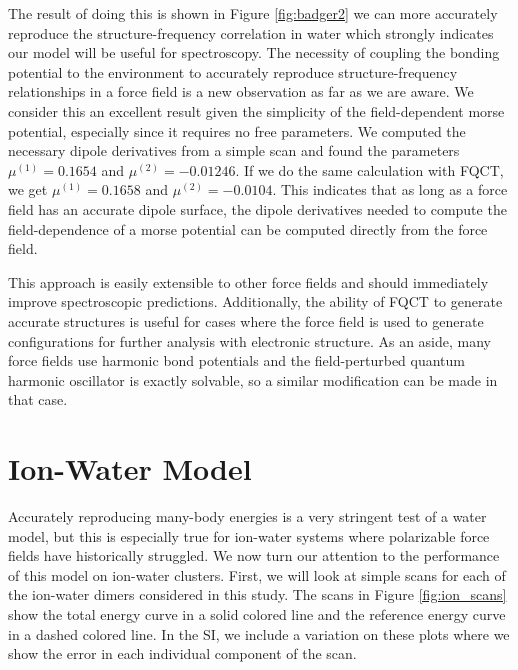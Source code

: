 \documentclass[journal=jctcce,manuscript=article]{achemso}
\begin{document}
The result of doing this is shown in Figure \ref{fig:badger2} we can more accurately reproduce the structure-frequency correlation in water which strongly indicates our model will be useful for spectroscopy. The necessity of coupling the bonding potential to the environment to accurately reproduce structure-frequency relationships in a force field is a new observation as far as we are aware. We consider this an excellent result given the simplicity of the field-dependent morse potential, especially since it requires no free parameters. We computed the necessary dipole derivatives from a simple  scan and found the parameters $\mu^{(1)}=0.1654$ and $\mu^{(2)}=-0.01246$. If we do the same calculation with FQCT, we get $\mu^{(1)}=0.1658$ and $\mu^{(2)}=-0.0104$. This indicates that as long as a force field has an accurate dipole surface, the dipole derivatives needed to compute the field-dependence of a morse potential can be computed directly from the force field.

This approach is easily extensible to other force fields and should immediately improve spectroscopic predictions. Additionally, the ability of FQCT to generate accurate structures is useful for cases where the force field is used to generate configurations for further analysis with electronic structure. As an aside, many force fields use harmonic bond potentials and the field-perturbed quantum harmonic oscillator is exactly solvable, so a similar modification can be made in that case.

\section*{Ion-Water Model}
Accurately reproducing many-body energies is a very stringent test of a water model, but this is especially true for ion-water systems where polarizable force fields have historically struggled. We now turn our attention to the performance of this model on ion-water clusters. First, we will look at simple scans for each of the ion-water dimers considered in this study. The scans in Figure \ref{fig:ion_scans} show the total energy curve in a solid colored line and the reference energy curve in a dashed colored line. In the SI, we include a variation on these plots where we show the error in each individual component of the scan.
\end{document}
